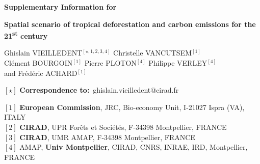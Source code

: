 
\begin{center}
  \Large{\textbf{Supplementary Information for}}
\end{center}

\vspace{1cm}

\begin{center}
  \LARGE{\textbf{\textcolor{pinpblue}{Spatial scenario of tropical deforestation and carbon emissions for the 21\textsuperscript{st} century}}}
\end{center}

\vspace{1cm}

\begin{center}
  \large{
  Ghislain VIEILLEDENT$^{[\star, 1, 2, 3, 4]}$ \hspace{0.5cm} Christelle VANCUTSEM$^{[1]}$\\
  \vspace{0.5cm}
  Clément BOURGOIN$^{[1]}$ \hspace{0.5cm} Pierre PLOTON$^{[4]}$ \hspace{0.5cm} Philippe VERLEY$^{[4]}$\\
  \vspace{0.5cm}
  and \hspace{0.5cm} Frédéric ACHARD$^{[1]}$
  }
\end{center}

\vspace{0.5cm}

\begin{center}
  $[\star]$ \textbf{Correspondence to:}~ghislain.vieilledent@cirad.fr\\
\end{center}

\vspace{0.5cm}

{\small
  \begin{flushleft}
    $[1]$ \textbf{European Commission}, JRC, Bio-economy Unit, I-21027 Ispra (VA), ITALY\\
    $[2]$ \textbf{CIRAD}, UPR Forêts et Sociétés, F-34398 Montpellier, FRANCE\\
    $[3]$ \textbf{CIRAD}, UMR AMAP, F-34398 Montpellier, FRANCE\\
    $[4]$ AMAP, \textbf{Univ Montpellier}, CIRAD, CNRS, INRAE, IRD, Montpellier, FRANCE\\
  \end{flushleft}}

